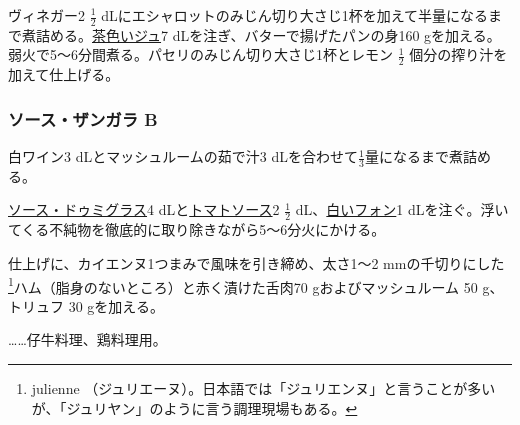\begin{recette}
ヴィネガー2 \(\frac{1}{2}\)
dLにエシャロットのみじん切り大さじ1杯を加えて半量になるまで煮詰める。\protect\hyperlink{jus-de-veau-lie}{茶色いジュ}7
dLを注ぎ、バターで揚げたパンの身160
gを加える。弱火で5〜6分間煮る。パセリのみじん切り大さじ1杯とレモン
\(\frac{1}{2}\) 個分の搾り汁を加えて仕上げる。

\hypertarget{sauce-zingara-b}{%
\subsubsection{ソース・ザンガラ B}\label{sauce-zingara-b}}



白ワイン3 dLとマッシュルームの茹で汁3
dLを合わせて\(\frac{1}{3}\)量になるまで煮詰める。

\protect\hyperlink{sauce-demi-glace}{ソース・ドゥミグラス}4
dLと\protect\hyperlink{sauce-tomate}{トマトソース}2 \(\frac{1}{2}\)
dL、\protect\hyperlink{fonds-blanc}{白いフォン}1
dLを注ぐ。浮いてくる不純物を徹底的に取り除きながら5〜6分火にかける。

仕上げに、カイエンヌ1つまみで風味を引き締め、太さ1〜2 mmの千切りにした
\footnote{julienne
  （ジュリエーヌ）。日本語では「ジュリエンヌ」と言うことが多いが、「ジュリヤン」のように言う調理現場もある。}ハム（脂身のないところ）と赤く漬けた舌肉70
gおよびマッシュルーム 50 g、トリュフ 30 gを加える。

\ldots{}\ldots{}仔牛料理、鶏料理用。
\end{recette}